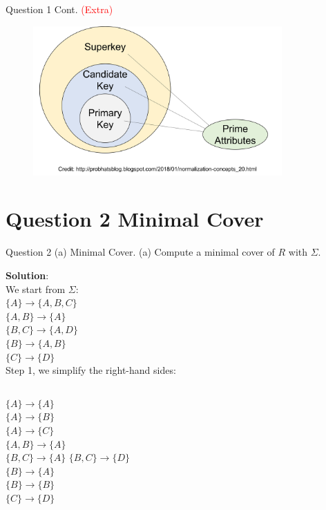 \begin{frame}[fragile]{Question 1 Cont. \textcolor{red}{(Extra)}}
\begin{figure}
	\includegraphics[width=0.85\textwidth, trim=0 0 0 0, clip]{t5/images/keys.png}
\end{figure}
\end{frame}

\section*{Question 2 Minimal Cover}

\begin{frame}[fragile]{Question 2 (a) Minimal Cover.}
	(a) Compute a minimal cover of $R$ with $\Sigma$.\vspace{10pt}

	\textbf{Solution}: \\\vspace{3pt}
	We start from $\Sigma$: \\\vspace{5pt}
	$\{A\} \rightarrow \{A, B, C\}$\\
	$\{A, B\} \rightarrow \{A\}$\\
	$\{B, C\} \rightarrow \{A, D\}$\\
	$\{B\} \rightarrow \{A, B\}$\\
	$\{C\} \rightarrow \{D\}$\\\vspace{5pt}
	Step 1, we simplify the right-hand sides:\\\vspace{3pt}
	\begin{columns}[t]
	$\{A\} \rightarrow \{A\}$\\
	$\{A\} \rightarrow \{B\}$\\
	$\{A\} \rightarrow \{C\}$\\
	$\{A, B\} \rightarrow \{A\}$\\
	$\{B, C\} \rightarrow \{A\}$
	$\{B, C\} \rightarrow \{D\}$\\
	$\{B\} \rightarrow \{A\}$\\
	$\{B\} \rightarrow \{B\}$\\
	$\{C\} \rightarrow \{D\}$
	\end{columns}
\end{frame}

